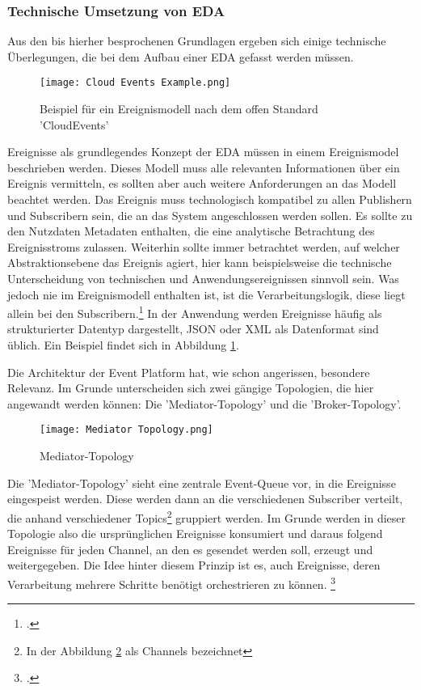 \subsubsection*{Technische Umsetzung von \ac{EDA}}
\label{teda}
Aus den bis hierher besprochenen Grundlagen ergeben sich einige technische Überlegungen, die bei dem Aufbau einer \ac{EDA} gefasst werden müssen.

\begin{figure}[H]
  \centering
  \texttt{[image: Cloud Events Example.png]}
  \caption[Beispiel für ein Ereignismodell]{Beispiel für ein Ereignismodell nach dem offen Standard 'CloudEvents' \footnotemark}
  \label{cloudeventslabel}
\end{figure}
Ereignisse als grundlegendes Konzept der \ac{EDA} müssen in einem Ereignismodel beschrieben werden. Dieses Modell muss alle relevanten Informationen über ein Ereignis vermitteln, es sollten aber auch weitere Anforderungen an das Modell beachtet werden. Das Ereignis muss technologisch kompatibel zu allen Publishern und Subscribern sein, die an das System angeschlossen werden sollen. Es sollte zu den Nutzdaten Metadaten enthalten, die eine analytische Betrachtung des Ereignisstroms zulassen. Weiterhin sollte immer betrachtet werden, auf welcher Abstraktionsebene das Ereignis agiert, hier kann beispielsweise die technische Unterscheidung von technischen und Anwendungsereignissen sinnvoll sein. Was jedoch nie im Ereignismodell enthalten ist, ist die Verarbeitungslogik, diese liegt allein bei den Subscribern.\footcite[Vgl. ][S. 95]{EDA2010} In der Anwendung werden Ereignisse häufig als strukturierter Datentyp dargestellt, JSON oder XML als Datenformat sind üblich. Ein Beispiel findet sich in Abbildung \ref{cloudeventslabel}.

Die Architektur der Event Platform hat, wie schon angerissen, besondere Relevanz. Im Grunde unterscheiden sich zwei gängige Topologien, die hier angewandt werden können: Die 'Mediator-Topology' und die 'Broker-Topology'. 
\begin{figure}[H]
  \centering
  \texttt{[image: Mediator Topology.png]}
  \caption[Mediator-Topology]{Mediator-Topology \footnotemark}
  \label{mediatortop}
\end{figure}
Die 'Mediator-Topology' sieht eine zentrale Event-Queue vor, in die Ereignisse eingespeist werden. Diese werden dann an die verschiedenen Subscriber verteilt, die anhand verschiedener Topics\footnote{In der Abbildung \ref{mediatortop} als Channels bezeichnet} gruppiert werden. Im Grunde werden in dieser Topologie also die ursprünglichen Ereignisse konsumiert und daraus folgend Ereignisse für jeden Channel, an den es gesendet werden soll, erzeugt und weitergegeben. Die Idee hinter diesem Prinzip ist es, auch Ereignisse, deren Verarbeitung mehrere Schritte benötigt orchestrieren zu können. \footcite[Vgl. ][]{wickramarachchi_2017_event} \\

